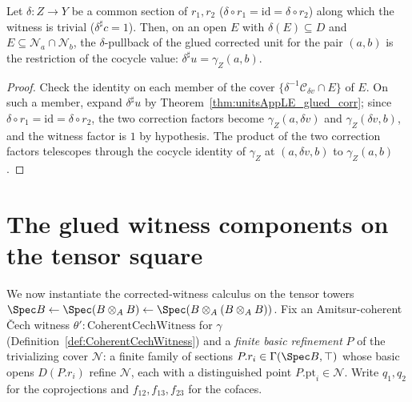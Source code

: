 \begin{theorem}
  \label{thm:glued_corr_collapse}
  \leanok
  Let \(\delta \colon Z \to Y\) be a common section of \(r_1, r_2\) (\(\delta \circ r_1 =
  \mathrm{id} = \delta \circ r_2\)) along which the witness is trivial
  (\(\delta^{\sharp} c = 1\)). Then, on an open \(E\) with \(\delta(E) \subseteq D\) and
  \(E \subseteq \mathcal N_a \cap \mathcal N_b\), the \(\delta\)-pullback of the glued corrected
  unit for the pair \((a, b)\) is the restriction of the cocycle value:
  \(\delta^{\sharp} u = \gamma_Z(a, b)\).
\end{theorem}
\begin{proof}
  \leanok
  Check the identity on each member of the cover \(\{\delta^{-1}\mathcal C_{\delta v} \cap E\}\)
  of \(E\). On such a member, expand \(\delta^{\sharp} u\) by
  Theorem~\ref{thm:unitsAppLE_glued_corr}; since \(\delta \circ r_1 = \mathrm{id} = \delta
  \circ r_2\), the two correction factors become \(\gamma_Z(a, \delta v)\) and
  \(\gamma_Z(\delta v, b)\), and the witness factor is \(1\) by hypothesis. The product of the
  two correction factors telescopes through the cocycle identity of \(\gamma_Z\) at
  \((a, \delta v, b)\) to \(\gamma_Z(a, b)\).
\end{proof}

\section{The glued witness components on the tensor square}
\label{sec:witnessComponents}

We now instantiate the corrected-witness calculus on the tensor towers \(\Spec B \leftarrow
\Spec(B \otimes_A B) \leftarrow \Spec(B \otimes_A (B \otimes_A B))\). Fix an
Amitsur-coherent \v Cech witness \(\theta' \colon \mathrm{CoherentCechWitness}\) for
\(\gamma\) (Definition~\ref{def:CoherentCechWitness}) and a \emph{finite basic refinement}
\(P\) of the trivializing cover \(\mathcal N\): a finite family of sections \(P.r_i \in
\Gamma(\Spec B, \top)\) whose basic opens \(D(P.r_i)\) refine \(\mathcal N\), each with a
distinguished point \(P.\mathrm{pt}_i \in \mathcal N\). Write \(q_1, q_2\) for the
coprojections and \(f_{12}, f_{13}, f_{23}\) for the cofaces.

